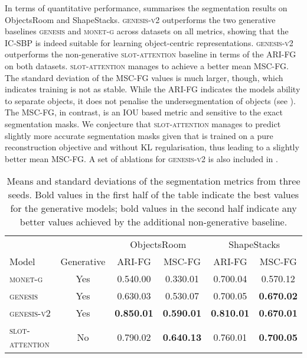 \documentclass{article}
\begin{document}
In terms of quantitative performance,  summarises the segmentation results on ObjectsRoom and ShapeStacks.
\textsc{genesis-v2} outperforms the two generative baselines \textsc{genesis} and \textsc{monet-g} across datasets on all metrics, showing that the IC-SBP is indeed suitable for learning object-centric representations.
\textsc{genesis-v2} outperforms the non-generative \textsc{slot-attention} baseline in terms of the ARI-FG on both datasets.
\textsc{slot-attention} manages to achieve a better mean MSC-FG.
The standard deviation of the MSC-FG values is much larger, though, which indicates training is not as stable.
While the ARI-FG indicates the models ability to separate objects, it does not penalise the undersegmentation of objects (see \cite{engelcke2020genesis}).
The MSC-FG, in contrast, is an IOU based metric and sensitive to the exact segmentation masks.
We conjecture that \textsc{slot-attention} manages to predict slightly more accurate segmentation masks given that is trained on a pure reconstruction objective and without KL regularisation, thus leading to a slightly better mean MSC-FG.
A set of ablations for \textsc{genesis-v2} is also included in .

\begin{table}
	\centering
    \caption{Means and standard deviations of the segmentation metrics from three seeds. Bold values in the first half of the table indicate the best values for the generative models; bold values in the second half indicate any better values achieved by the additional non-generative baseline.}
	\begin{tabular}{lccccc}
		\toprule
		& & \multicolumn{2}{c}{ObjectsRoom} & \multicolumn{2}{c}{ShapeStacks} \\
		\cmidrule(r){3-4} \cmidrule(l){5-6}
		Model & Generative & ARI-FG & MSC-FG & ARI-FG & MSC-FG \\
		\midrule
		\textsc{monet-g}        & Yes & 0.540.00 & 0.330.01 & {0.700.04} & 0.570.12 \\
		\textsc{genesis}        & Yes & {0.630.03} & {0.530.07} & {0.700.05} & \textbf{0.670.02}\\
		\textsc{genesis-v2}      & Yes & \textbf{0.850.01}  & \textbf{0.590.01}  & \textbf{0.810.01} & \textbf{0.670.01}\\
        \midrule
        \textsc{slot-attention} & No & 0.790.02           & \textbf{0.640.13}  & 0.760.01          & \textbf{0.700.05}\\
		\bottomrule
	\end{tabular}
	\label{tab:gpp:seg}
\end{table}
\end{document}
